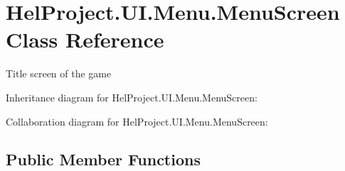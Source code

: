 \hypertarget{class_hel_project_1_1_u_i_1_1_menu_1_1_menu_screen}{}\section{Hel\+Project.\+U\+I.\+Menu.\+Menu\+Screen Class Reference}
\label{class_hel_project_1_1_u_i_1_1_menu_1_1_menu_screen}


Title screen of the game  




Inheritance diagram for Hel\+Project.\+U\+I.\+Menu.\+Menu\+Screen\+:


Collaboration diagram for Hel\+Project.\+U\+I.\+Menu.\+Menu\+Screen\+:
\subsection*{Public Member Functions}
